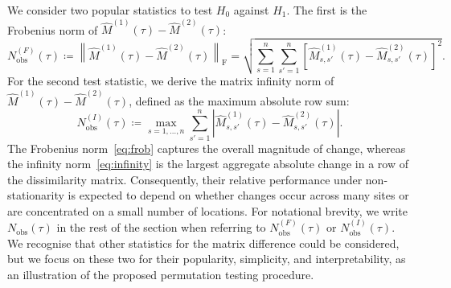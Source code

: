 \documentclass[APA,STIX1COL]{WileyNJD-v2}
\begin{document}
We consider two popular statistics to test $H_0$ against $H_1$. 
The first is the Frobenius norm of $\widehat{M}^{(1)}(\tau) - \widehat{M}^{(2)}(\tau)$:
\begin{equation} 
\label{eq:frob}
N_{\mathrm{obs}}^{(F)}(\tau) \coloneq \left\| \widehat{M}^{(1)}(\tau) - \widehat{M}^{(2)}(\tau) \right\|_{\mathrm{F}} = \sqrt{\sum_{s=1}^n \sum_{s'=1}^n \left[\widehat{M}^{(1)}_{s,s'}(\tau) - \widehat{M}^{(2)}_{s,s'}(\tau)\right]^2}.
\end{equation}
For the second test statistic, we derive the matrix infinity norm of $\widehat{M}^{(1)}(\tau) - \widehat{M}^{(2)}(\tau)$, defined as the maximum absolute row sum:
\begin{equation}
\label{eq:infinity}
N_{\mathrm{obs}}^{(I)}(\tau) \coloneq \max_{s=1,\ldots,n} \sum_{s'=1}^n \left|\widehat{M}^{(1)}_{s,s'}(\tau) - \widehat{M}^{(2)}_{s,s'}(\tau)\right|.
\end{equation}
The Frobenius norm~\eqref{eq:frob} captures the overall magnitude of change, whereas the infinity norm~\eqref{eq:infinity} is the largest aggregate absolute change in a row of the dissimilarity matrix. 
Consequently, their relative performance under non-stationarity is expected to depend on whether changes occur across many sites or are concentrated on a small number of locations. 
For notational brevity, we write $N_{\mathrm{obs}}(\tau)$ in the rest of the section when referring to $N_{\mathrm{obs}}^{(F)}(\tau)$ or $N_{\mathrm{obs}}^{(I)}(\tau)$. We recognise that other statistics for the matrix difference could be considered, but we focus on these two for their popularity, simplicity, and interpretability, as an illustration of the proposed permutation testing procedure.
\end{document}

